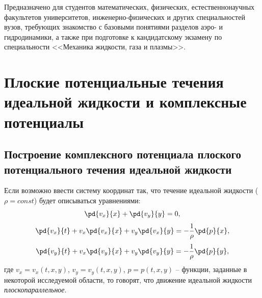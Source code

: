 \documentclass[a4paper, 14pt]{extarticle}
\begin{document}
Предназначено для студентов математических, физических, естественнонаучных факультетов университетов, инженерно-физических и других специальностей вузов, требующих знакомство с базовыми понятиями разделов аэро- и гидродинамики, а также при подготовке к кандидатскому экзамену по специальности <<Механика жидкости, газа и плазмы>>.	

%
%
%	
%	


\newpage\normalfont\normalsize
\tableofcontents
	
	
\section{Плоские потенциальные течения идеальной жидкости и комплексные потенциалы}



\subsection{Построение комплексного потенциала плоского потенциального течения идеальной жидкости }

Если возможно ввести систему координат так, что течение идеальной жидкости ($\rho=const$) будет описываться уравнениями:	
\begin{equation}
	\label{eq:ideal_liquid_planar_mass}
	\pd{v_x}{x}+\pd{v_y}{y} = 0,
\end{equation}
\begin{equation}
	\label{eq:ideal_liquid_planar_momentum_x}
	\pd{v_x}{t}+v_x \pd{v_x}{x} + v_y \pd{v_x}{y} = -\frac{1}{\rho} \pd{p}{x},
\end{equation}	
\begin{equation}
	\label{eq:ideal_liquid_planar_momentum_y}
	\pd{v_y}{t}+v_x \pd{v_y}{x} + v_y \pd{v_y}{y} = -\frac{1}{\rho} \pd{p}{y},	
\end{equation}
где $v_x = v_x(t,x,y)$, $v_y = v_y(t,x,y)$, $p=p(t,x,y)$ -- функции, заданные в некоторой исследуемой области, то говорят, что движение идеальной жидкости \textit{плоскопараллельное}.
\end{document}

